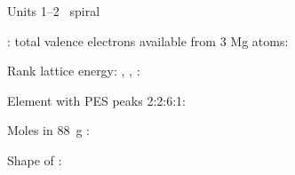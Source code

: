 \documentclass{apchem-worksheet}
\begin{document}
\begin{spiralstrip}{Units 1--2 \textbullet\ spiral}
  \item {}: total valence electrons available from 3 Mg atoms:
  \item Rank lattice energy: , , :
  \item Element with PES peaks 2:2:6:1: 
  \item Moles in \SI{88}{\gram} : 
  \item Shape of : 
\end{spiralstrip}
\end{document}
